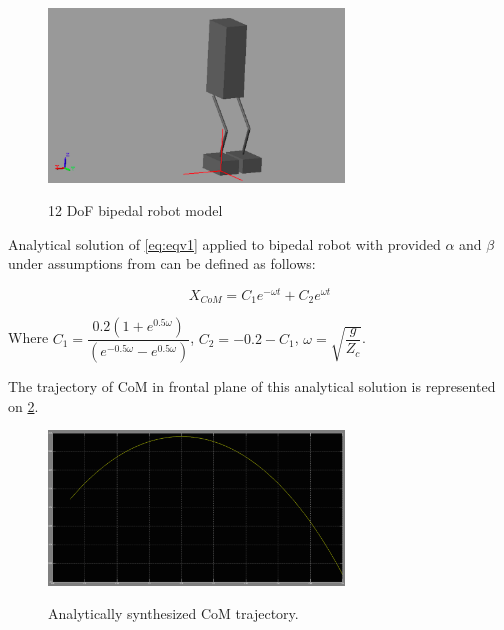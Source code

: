 \documentclass[12pt,a4paper]{report}
\begin{document}
		\begin{figure}[h!]
			\vspace{-0.2cm}
			\centering
			{\includegraphics[width=0.7\textwidth]{21}}
			\caption{12 DoF bipedal robot model}
			\label{fig:21}
			\vspace{-0.1cm}
		\end{figure} 
		
		Analytical solution of \ref{eq:eqv1} applied to bipedal robot with provided $\alpha$ and $\beta$ under assumptions from \cite{ha2007effective} can be defined as follows:
		
		\begin{equation}
			X_{CoM} = C_1 e^{-\omega t} + C_2 e^{\omega t}
		\end{equation}
		
		Where $C_1 = \dfrac{0.2(1+e^{0.5\omega })}{(e^{-0.5\omega }-e^{0.5\omega })}$, $C_2=-0.2-C_1$, $\omega = \sqrt{\dfrac{g}{Z_c}}$.
		
		The trajectory of CoM in frontal plane of this analytical solution is represented on \cref{fig:24}.
		
			\begin{figure}[h!]
				\vspace{-0.2cm}
				\centering
				{\includegraphics[width=0.7\textwidth]{24}}
				\caption{Analytically synthesized CoM trajectory.}
				\label{fig:24}
				\vspace{-0.1cm}
			\end{figure}
		
\end{document}
